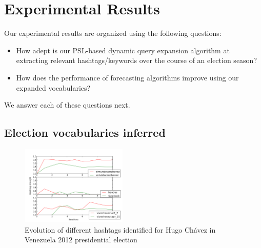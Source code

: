 

\section{Experimental Results}
Our experimental results are organized using the following questions:
\begin{itemize}
\item How adept is our PSL-based dynamic query expansion algorithm at extracting relevant hashtags/keywords over the course
of an election season?
\item How does the performance of forecasting algorithms improve using our expanded vocabularies?
\end{itemize}
We answer each of these questions next.

\subsection{Election vocabularies inferred}

\begin{figure}[Ht]
	\centering
	\includegraphics[height=0.2\textheight, width=0.45\textwidth]{support_files/hashTagTimeSeries.png}
	\caption{Evolution of different hashtags identified for Hugo Ch\'{a}vez in Venezuela 2012 presidential election}
	\label{fig:timeSeries}
\end{figure}

